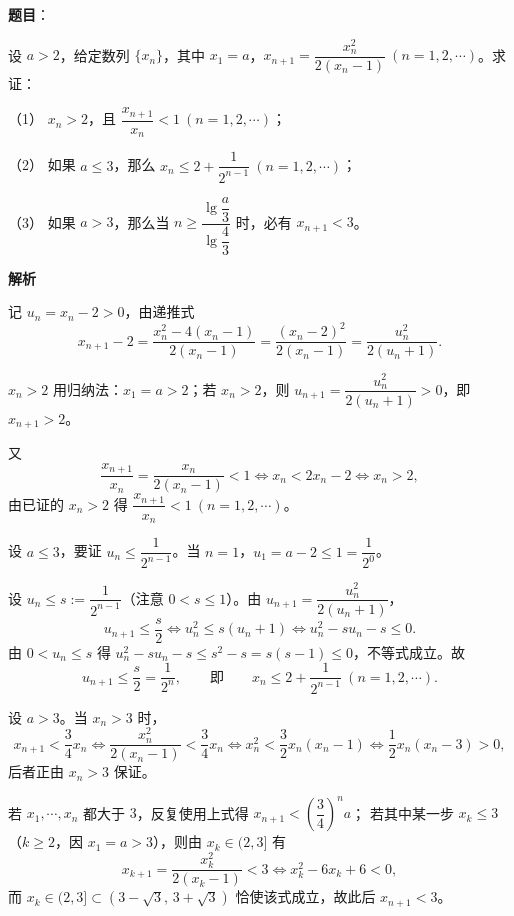 \begin{answer}

\textbf{题目}：

设 $a>2$，给定数列 $\{x_n\}$，其中 $x_1=a$，$x_{n+1}=\dfrac{x_n^2}{2(x_n-1)}\ (n=1,2,\cdots)$。求证：

（1） $x_n>2$，且 $\dfrac{x_{n+1}}{x_n}<1\ (n=1,2,\cdots)$；

（2） 如果 $a\leqslant3$，那么 $x_n\leqslant2+\dfrac{1}{2^{n-1}}\ (n=1,2,\cdots)$；

（3） 如果 $a>3$，那么当 $n\geqslant\dfrac{\lg\dfrac a3}{\lg\dfrac43}$ 时，必有 $x_{n+1}<3$。

\textbf{解析}

记 $u_n=x_n-2>0$，由递推式
\nopagebreak[4]
\[
x_{n+1}-2=\frac{x_n^2-4(x_n-1)}{2(x_n-1)}=\frac{(x_n-2)^2}{2(x_n-1)}=\frac{u_n^2}{2(u_n+1)}.
\]


$x_n>2$ 用归纳法：$x_1=a>2$；若 $x_n>2$，则 $u_{n+1}=\dfrac{u_n^2}{2(u_n+1)}>0$，即 $x_{n+1}>2$。

又
\nopagebreak[4]
\[
\frac{x_{n+1}}{x_n}=\frac{x_n}{2(x_n-1)}<1\iff x_n<2x_n-2\iff x_n>2,
\]
由已证的 $x_n>2$ 得 $\dfrac{x_{n+1}}{x_n}<1\ (n=1,2,\cdots)$。


设 $a\leqslant3$，要证 $u_n\leqslant\dfrac1{2^{n-1}}$。当 $n=1$，$u_1=a-2\leqslant1=\dfrac1{2^0}$。

设 $u_n\leqslant s:=\dfrac1{2^{n-1}}$（注意 $0<s\leqslant1$）。由 $u_{n+1}=\dfrac{u_n^2}{2(u_n+1)}$，
\nopagebreak[4]
\[
u_{n+1}\leqslant\frac s2\iff u_n^2\leqslant s(u_n+1)\iff u_n^2-su_n-s\leqslant0.
\]
由 $0<u_n\leqslant s$ 得 $u_n^2-su_n-s\leqslant s^2-s=s(s-1)\leqslant0$，不等式成立。故
\nopagebreak[4]
\[
u_{n+1}\leqslant\frac s2=\frac1{2^{n}},\qquad\text{即}\qquad x_n\leqslant2+\frac1{2^{n-1}}\ (n=1,2,\cdots).
\]


设 $a>3$。当 $x_n>3$ 时，
\nopagebreak[4]
\[
x_{n+1}<\frac34x_n\iff \frac{x_n^2}{2(x_n-1)}<\frac34x_n\iff x_n^2<\frac32x_n(x_n-1)\iff \frac12x_n(x_n-3)>0,
\]
后者正由 $x_n>3$ 保证。

若 $x_1,\cdots,x_n$ 都大于 $3$，反复使用上式得 $x_{n+1}<\left(\dfrac34\right)^n a$；
若其中某一步 $x_k\leqslant3$（$k\geqslant2$，因 $x_1=a>3$），则由 $x_k\in(2,3]$ 有
\nopagebreak[4]
\[
x_{k+1}=\frac{x_k^2}{2(x_k-1)}<3\iff x_k^2-6x_k+6<0,
\]
而 $x_k\in(2,3]\subset(3-\sqrt3,\,3+\sqrt3)$ 恰使该式成立，故此后 $x_{n+1}<3$。


\end{answer}
